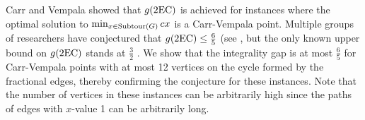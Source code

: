 
Carr and Vempala \cite{Carr2004} showed that $g(\2ec)$ is achieved for instances where the optimal solution to $\min_{x\in \operatorname{{Subtour}}(G)}cx$ is a Carr-Vempala point. Multiple groups of researchers have conjectured that $g(\2ec)\leq \frac{6}{5}$ (see \cite{alexander2006integrality,boydlegault,hn19}, but the only known upper bound on $g(\2ec)$ stands at $\frac{3}{2}$ \cite{wolsey}. We show that the integrality gap is at most $\frac{6}{5}$ for Carr-Vempala points with at most 12 vertices on the cycle formed by the fractional edges, thereby confirming the conjecture for these instances. Note that the number of vertices in these instances can be arbitrarily high since the paths of edges with $x$-value 1 can be arbitrarily long.
 
